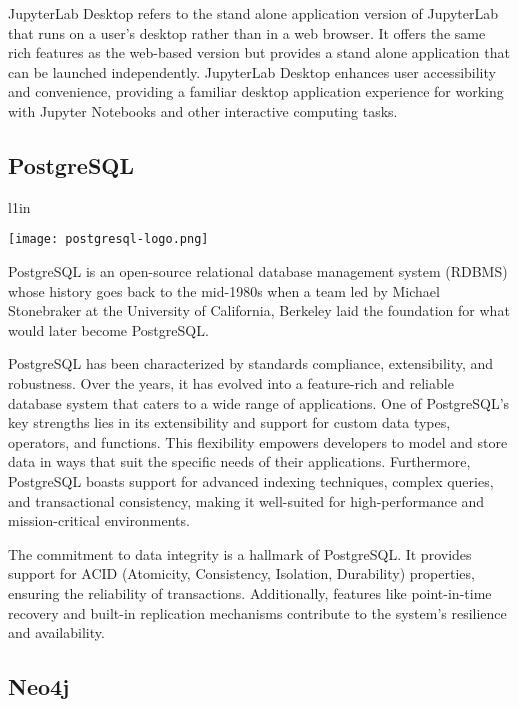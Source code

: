 JupyterLab Desktop refers to the stand alone application version of JupyterLab that runs on a user's desktop rather than in a web browser. It offers the same rich features as the web-based version but provides a stand alone application that can be launched independently. JupyterLab Desktop enhances user accessibility and convenience, providing a familiar desktop application experience for working with Jupyter Notebooks and other interactive computing tasks.

\subsection*{PostgreSQL}

\begin{wrapfigure}{l}{1in}
\begin{center}
\texttt{[image: postgresql-logo.png]}
\end{center}
\end{wrapfigure}

PostgreSQL is an open-source relational database management system (RDBMS) whose history goes back to the mid-1980s when a team led by Michael Stonebraker at the University of California, Berkeley laid the foundation for what would later become PostgreSQL.

PostgreSQL has been characterized by standards compliance, extensibility, and robustness. Over the years, it has evolved into a feature-rich and reliable database system that caters to a wide range of applications. One of PostgreSQL's key strengths lies in its extensibility and support for custom data types, operators, and functions. This flexibility empowers developers to model and store data in ways that suit the specific needs of their applications. Furthermore, PostgreSQL boasts support for advanced indexing techniques, complex queries, and transactional consistency, making it well-suited for high-performance and mission-critical environments.

The commitment to data integrity is a hallmark of PostgreSQL. It provides support for ACID (Atomicity, Consistency, Isolation, Durability) properties, ensuring the reliability of transactions. Additionally, features like point-in-time recovery and built-in replication mechanisms contribute to the system's resilience and availability.

\subsection*{Neo4j}

